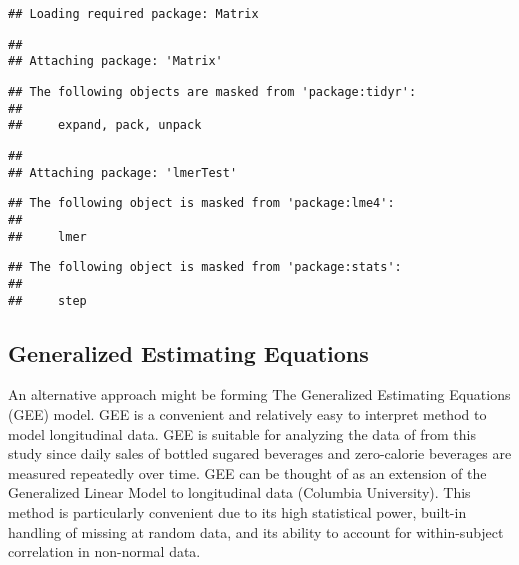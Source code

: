 \documentclass[
]{article}
\begin{document}
\begin{verbatim}
## Loading required package: Matrix
\end{verbatim}

\begin{verbatim}
## 
## Attaching package: 'Matrix'
\end{verbatim}

\begin{verbatim}
## The following objects are masked from 'package:tidyr':
## 
##     expand, pack, unpack
\end{verbatim}

\begin{verbatim}
## 
## Attaching package: 'lmerTest'
\end{verbatim}

\begin{verbatim}
## The following object is masked from 'package:lme4':
## 
##     lmer
\end{verbatim}

\begin{verbatim}
## The following object is masked from 'package:stats':
## 
##     step
\end{verbatim}

\hypertarget{generalized-estimating-equations}{%
\subsection{Generalized Estimating Equations}\label{generalized-estimating-equations}}

An alternative approach might be forming The Generalized Estimating Equations (GEE) model. GEE is a convenient and relatively easy to interpret method to model longitudinal data. GEE is suitable for analyzing the data of from this study since daily sales of bottled sugared beverages and zero-calorie beverages are measured repeatedly over time. GEE can be thought of as an extension of the Generalized Linear Model to longitudinal data (Columbia University). This method is particularly convenient due to its high statistical power, built-in handling of missing at random data, and its ability to account for within-subject correlation in non-normal data.
\end{document}
